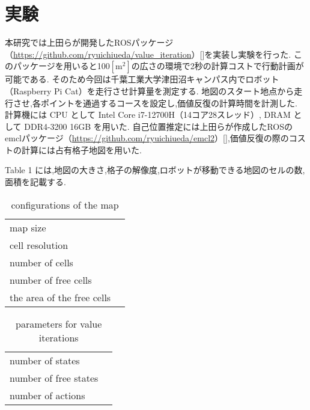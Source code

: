 \documentclass{jarticle}
\begin{document}

\section{実験}%
本研究では上田らが開発したROSパッケージ（\href{https://github.com/ryuichiueda/value_iteration}{https://github.com/ryuichiueda/value\_iteration}）[]を実装し実験を行った.
このパッケージを用いると100$\mathrm{[m^2]}$の広さの環境で2秒の計算コストで行動計画が可能である.
そのため今回は千葉工業大学津田沼キャンパス内でロボット（Raspberry Pi Cat）を走行させ計算量を測定する.
地図のスタート地点から走行させ,各ポイントを通過するコースを設定し,価値反復の計算時間を計測した.
計算機には CPU として Intel Core i7-12700H（14コア28スレッド）, DRAM として DDR4-3200 16GB を用いた.
自己位置推定には上田らが作成したROSのemclパッケージ（\href{https://github.com/ryuichiueda/emcl2}{https://github.com/ryuichiueda/emcl2}）[],価値反復の際のコストの計算には占有格子地図を用いた.

Table 1 には,地図の大きさ,格子の解像度,ロボットが移動できる地図のセルの数,面積を記載する.

\begin{table}[hbtp]
  \caption{conﬁgurations of the map}
  \centering
  \begin{tabular}{l|r}
    \hline
    map size & \\
    cell resolution &  \\
		number of cells & \\
    number of free cells & \\
		the area of the free cells & \\
    \hline
  \end{tabular}
\end{table}

\begin{table}[hbtp]
  \caption{parameters for value iterations}
  \centering
  \begin{tabular}{l|r}
    \hline
    number of states & \\
    number of free states &  \\
		number of actions & \\
    \hline
  \end{tabular}
\end{table}
\end{document}
